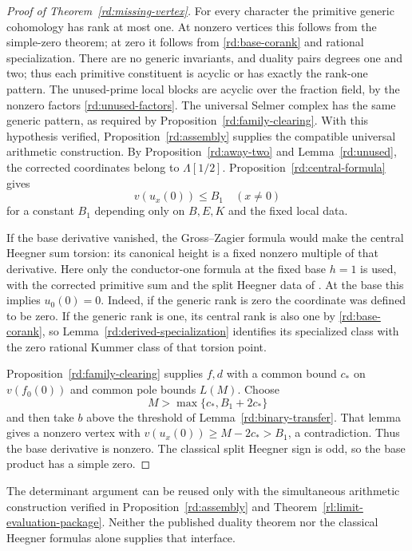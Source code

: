 \begin{proof}[Proof of Theorem~\ref{rd:missing-vertex}]
For every character the primitive generic
cohomology has rank at most one.  At nonzero
vertices this follows from the simple-zero
theorem; at zero it follows from
\eqref{rd:base-corank} and rational
specialization.  There are no generic invariants, and duality
pairs degrees one and two; thus each primitive constituent is acyclic
or has exactly the rank-one pattern.  The unused-prime local blocks
are acyclic over the fraction field, by the nonzero factors
\eqref{rd:unused-factors}.  The universal Selmer complex has the
same generic pattern, as required by
Proposition~\ref{rd:family-clearing}.  With this hypothesis
verified, Proposition~\ref{rd:assembly} supplies the compatible
universal arithmetic construction.  By Proposition~\ref{rd:away-two}
and Lemma~\ref{rd:unused}, the corrected
coordinates belong to \(\Lambda[1/2]\).
Proposition~\ref{rd:central-formula} gives
\[
 v(u_x(0))\le B_1\quad(x\ne0)
 \]
for a constant \(B_1\) depending only on
\(B,E,K\) and the fixed local data.

If the base derivative vanished, the
Gross--Zagier formula would make the
central Heegner sum torsion: its canonical
height is a fixed nonzero multiple of
that derivative.  Here only the conductor-one formula at
the fixed base \(h=1\) is used, with the corrected primitive
sum and the split Heegner data of
\cite[Theorem~1.1]{CaiShuTian2014}.
At the base this implies \(u_0(0)=0\).
Indeed, if the generic rank is zero the
coordinate was defined to be zero.  If the
generic rank is one, its central rank is
also one by \eqref{rd:base-corank}, so
Lemma~\ref{rd:derived-specialization}
identifies its specialized class with
the zero rational Kummer class of that
torsion point.

Proposition~\ref{rd:family-clearing} supplies
\(f,d\) with a common bound \(c_*\) on
\(v(f_0(0))\) and common pole bounds
\(L(M)\).  Choose
\[
 M>\max\{c_*,B_1+2c_*\}
 \]
and then take \(b\) above the threshold
of Lemma~\ref{rd:binary-transfer}.
That lemma gives a nonzero vertex with
\(v(u_x(0))\ge M-2c_*>B_1\), a
contradiction.  Thus the base derivative
is nonzero.  The classical split Heegner
sign is odd, so the base product has
a simple zero.
\end{proof}

\begin{remark}
\label{rd:interface-status}
The determinant argument can be reused only with
the simultaneous arithmetic construction verified
in Proposition~\ref{rd:assembly} and
Theorem~\ref{rl:limit-evaluation-package}.
Neither the published duality theorem nor the
classical Heegner formulas alone supplies that
interface.
\end{remark}
